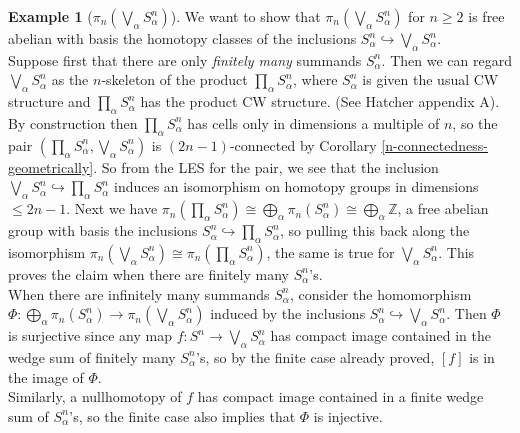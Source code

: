\documentclass[reqno]{amsart}
\theoremstyle{definition}
\newtheorem{example}[theorem]{Example}
\theoremstyle{remark}
\begin{document}
\begin{example}[$\pi_n \left( \bigvee_{\alpha}\label{Example:Wedge-of-Spheres}
    S_{\alpha}^{n} \right) $]
    We want to show that
    $\pi_n \left( \bigvee_{\alpha}S_{\alpha}^{n} \right) $ 
    for $n\ge 2$ is free abelian with basis
    the homotopy classes of the inclusions
    $S_{\alpha}^{n} \hookrightarrow 
    \bigvee_{\alpha} S_{\alpha}^{n}$.\\
    Suppose first that there are only \textit{finitely many}
    summands $S_{\alpha}^{n}$. Then we can regard
    $\bigvee_{\alpha} S_{\alpha}^{n}$ as
    the $n$-skeleton of the product
    $\prod_{\alpha} S_{\alpha}^{n}$, where
    $S_{\alpha}^{n}$ is given the usual CW structure
    and $\prod_{\alpha} S_{\alpha}^{n}$ has the product
    CW structure. (See Hatcher appendix A).\\
    By construction then $\prod_{\alpha} S_{\alpha}^{n}$ 
    has cells only in dimensions a multiple of $n$, so
    the pair $\left( \prod_{\alpha} S_{\alpha}^{n},
    \bigvee_{\alpha} S_{\alpha}^{n} \right) $ is
    $(2n-1)$-connected by Corollary 
    \ref{n-connectedness-geometrically}.
    So from the LES for the pair, we see that
    the inclusion
    $\bigvee_{\alpha} S_{\alpha}^{n}
    \hookrightarrow \prod_{\alpha} S_{\alpha}^{n}$
    induces an isomorphism on homotopy groups
    in dimensions $\le 2n-1$. Next we have
    $\pi_n \left( \prod_{\alpha} S_{\alpha}^{n} \right) 
    \cong \bigoplus_{\alpha} \pi_n \left( S_{\alpha}^{n} \right) 
    \cong \bigoplus_{\alpha} \mathbb{Z}$,
    a free abelian group with basis the inclusions
    $S_{\alpha}^{n} \hookrightarrow \prod_{\alpha}
    S_{\alpha}^{n}$, so pulling this back along the
    isomorphism
    $\pi_{n}\left( \bigvee_{\alpha}S_{\alpha}^{n} \right) 
    \cong \pi_n \left( \prod_{\alpha}S_{\alpha}^{n} \right) $,
    the same is true for $\bigvee_{\alpha}S_{\alpha}^{n}$.
    This proves the claim when there are
    finitely many $S_{\alpha}^{n}$'s.\\
    When there are infinitely many summands
    $S_{\alpha}^{n}$, consider the homomorphism
    $\Phi \colon \bigoplus_{\alpha}
    \pi_n \left( S_{\alpha}^{n} \right) \to 
    \pi_n \left( \bigvee_{\alpha}S_{\alpha}^{n} \right) $ 
    induced by the inclusions
    $S_{\alpha}^{n} \hookrightarrow \bigvee_{\alpha}
    S_{\alpha}^{n}$. Then $\Phi$ is surjective
    since any map $f \colon S^{n} \to 
    \bigvee_{\alpha}S_{\alpha}^{n}$ has compact
    image contained in the wedge sum of finitely many
    $S_{\alpha}^{n}$'s, so by the finite case already proved,
    $\left[ f \right] $ is in the image of $\Phi$.\\
    Similarly, a nullhomotopy of $f$ has compact image
    contained in a finite wedge sum of $S_{\alpha}^{n}$'s,
    so the finite case also implies that $\Phi$ is injective.
\end{example}
\end{document}
